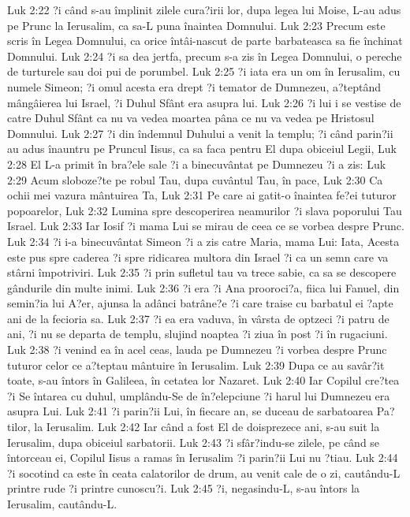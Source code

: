 Luk 2:22  ?i când s-au împlinit zilele cura?irii lor, dupa legea lui Moise, L-au adus pe Prunc la Ierusalim, ca sa-L puna înaintea Domnului.
Luk 2:23  Precum este scris în Legea Domnului, ca orice întâi-nascut de parte barbateasca sa fie închinat Domnului.
Luk 2:24  ?i sa dea jertfa, precum s-a zis în Legea Domnului, o pereche de turturele sau doi pui de porumbel.
Luk 2:25  ?i iata era un om în Ierusalim, cu numele Simeon; ?i omul acesta era drept ?i temator de Dumnezeu, a?teptând mângâierea lui Israel, ?i Duhul Sfânt era asupra lui.
Luk 2:26  ?i lui i se vestise de catre Duhul Sfânt ca nu va vedea moartea pâna ce nu va vedea pe Hristosul Domnului.
Luk 2:27  ?i din îndemnul Duhului a venit la templu; ?i când parin?ii au adus înauntru pe Pruncul Iisus, ca sa faca pentru El dupa obiceiul Legii,
Luk 2:28  El L-a primit în bra?ele sale ?i a binecuvântat pe Dumnezeu ?i a zis:
Luk 2:29  Acum sloboze?te pe robul Tau, dupa cuvântul Tau, în pace,
Luk 2:30  Ca ochii mei vazura mântuirea Ta,
Luk 2:31  Pe care ai gatit-o înaintea fe?ei tuturor popoarelor,
Luk 2:32  Lumina spre descoperirea neamurilor ?i slava poporului Tau Israel.
Luk 2:33  Iar Iosif ?i mama Lui se mirau de ceea ce se vorbea despre Prunc.
Luk 2:34  ?i i-a binecuvântat Simeon ?i a zis catre Maria, mama Lui: Iata, Acesta este pus spre caderea ?i spre ridicarea multora din Israel ?i ca un semn care va stârni împotriviri.
Luk 2:35  ?i prin sufletul tau va trece sabie, ca sa se descopere gândurile din multe inimi.
Luk 2:36  ?i era ?i Ana prooroci?a, fiica lui Fanuel, din semin?ia lui A?er, ajunsa la adânci batrâne?e ?i care traise cu barbatul ei ?apte ani de la fecioria sa.
Luk 2:37  ?i ea era vaduva, în vârsta de optzeci ?i patru de ani, ?i nu se departa de templu, slujind noaptea ?i ziua în post ?i în rugaciuni.
Luk 2:38  ?i venind ea în acel ceas, lauda pe Dumnezeu ?i vorbea despre Prunc tuturor celor ce a?teptau mântuire în Ierusalim.
Luk 2:39  Dupa ce au savâr?it toate, s-au întors în Galileea, în cetatea lor Nazaret.
Luk 2:40  Iar Copilul cre?tea ?i Se întarea cu duhul, umplându-Se de în?elepciune ?i harul lui Dumnezeu era asupra Lui.
Luk 2:41  ?i parin?ii Lui, în fiecare an, se duceau de sarbatoarea Pa?tilor, la Ierusalim.
Luk 2:42  Iar când a fost El de doisprezece ani, s-au suit la Ierusalim, dupa obiceiul sarbatorii.
Luk 2:43  ?i sfâr?indu-se zilele, pe când se întorceau ei, Copilul Iisus a ramas în Ierusalim ?i parin?ii Lui nu ?tiau.
Luk 2:44  ?i socotind ca este în ceata calatorilor de drum, au venit cale de o zi, cautându-L printre rude ?i printre cunoscu?i.
Luk 2:45  ?i, negasindu-L, s-au întors la Ierusalim, cautându-L.

